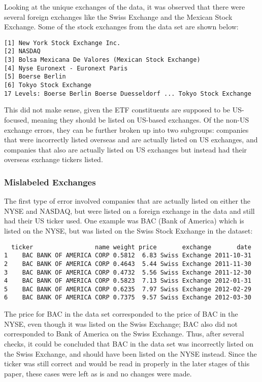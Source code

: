 \documentclass[12pt,twoside]{reedthesis}
\theoremstyle{definition}
\theoremstyle{definition}
\theoremstyle{definition}
\theoremstyle{remark}
\begin{document}
Looking at the unique exchanges of the data, it was observed that there
were several foreign exchanges like the Swiss Exchange and the Mexican
Stock Exchange. Some of the stock exchanges from the data set are shown
below:
\begin{verbatim}
[1] New York Stock Exchange Inc.                      
[2] NASDAQ                                            
[3] Bolsa Mexicana De Valores (Mexican Stock Exchange)
[4] Nyse Euronext - Euronext Paris                    
[5] Boerse Berlin                                     
[6] Tokyo Stock Exchange                              
17 Levels: Boerse Berlin Boerse Duesseldorf ... Tokyo Stock Exchange
\end{verbatim}
This did not make sense, given the ETF constituents are supposed to be
US-focused, meaning they should be listed on US-based exchanges. Of the
non-US exchange errors, they can be further broken up into two
subgroups: companies that were incorrectly listed overseas and are
actually listed on US exchanges, and companies that also are actually
listed on US exchanges but instead had their overseas exchange tickers
listed.

\subsubsection{Mislabeled Exchanges}\label{mislabeled-exchanges}

The first type of error involved companies that are actually listed on
either the NYSE and NASDAQ, but were listed on a foreign exchange in the
data and still had their US ticker used. One example was BAC (Bank of
America) which is listed on the NYSE, but was listed on the Swiss Stock
Exchange in the dataset:
\begin{verbatim}
  ticker                 name weight price       exchange       date
1    BAC BANK OF AMERICA CORP 0.5812  6.83 Swiss Exchange 2011-10-31
2    BAC BANK OF AMERICA CORP 0.4643  5.44 Swiss Exchange 2011-11-30
3    BAC BANK OF AMERICA CORP 0.4732  5.56 Swiss Exchange 2011-12-30
4    BAC BANK OF AMERICA CORP 0.5823  7.13 Swiss Exchange 2012-01-31
5    BAC BANK OF AMERICA CORP 0.6235  7.97 Swiss Exchange 2012-02-29
6    BAC BANK OF AMERICA CORP 0.7375  9.57 Swiss Exchange 2012-03-30
\end{verbatim}
The price for BAC in the data set corresponded to the price of BAC in
the NYSE, even though it was listed on the Swiss Exchange; BAC also did
not corresponded to Bank of America on the Swiss Exchange. Thus, after
several checks, it could be concluded that BAC in the data set was
incorrectly listed on the Swiss Exchange, and should have been listed on
the NYSE instead. Since the ticker was still correct and would be read
in properly in the later stages of this paper, these cases were left as
is and no changes were made.
\end{document}
